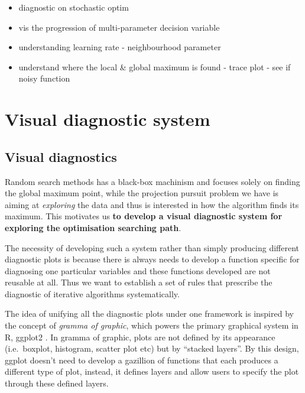\documentclass[12pt]{article}
\providecommand{\tightlist}{%
  \setlength{\itemsep}{0pt}\setlength{\parskip}{0pt}}
\begin{document}
\begin{itemize}
\tightlist
\item
  diagnostic on stochastic optim
\item
  vis the progression of multi-parameter decision variable
\item
  understanding learning rate - neighbourhood parameter
\item
  understand where the local \& global maximum is found - trace plot -
  see if noisy function
\end{itemize}

\hypertarget{visual-diagnostic-system}{%
\section{Visual diagnostic system}\label{visual-diagnostic-system}}

\hypertarget{visual-diagnostics}{%
\subsection{Visual diagnostics}\label{visual-diagnostics}}

Random search methods has a black-box machinism and focuses solely on
finding the global maximum point, while the projection pursuit problem
we have is aiming at \emph{exploring} the data and thus is interested in
how the algorithm finds its maximum. This motivates us \textbf{to
develop a visual diagnostic system for exploring the optimisation
searching path}.

The necessity of developing such a system rather than simply producing
different diagnostic plots is because there is always needs to develop a
function specific for diagnosing one particular variables and these
functions developed are not reusable at all. Thus we want to establish a
set of rules that prescribe the diagnostic of iterative algorithms
systematically.

The idea of unifying all the diagnostic plots under one framework is
inspired by the concept of \emph{gramma of
graphic}\citep{wickham2010layered}, which powers the primary graphical
system in R, ggplot2 \citep{ggplot2}. In gramma of graphic, plots are
not defined by its appearance (i.e.~boxplot, histogram, scatter plot
etc) but by ``stacked layers''. By this design, ggplot doesn't need to
develop a gazillion of functions that each produces a different type of
plot, instead, it defines layers and allow users to specify the plot
through these defined layers.
\end{document}
